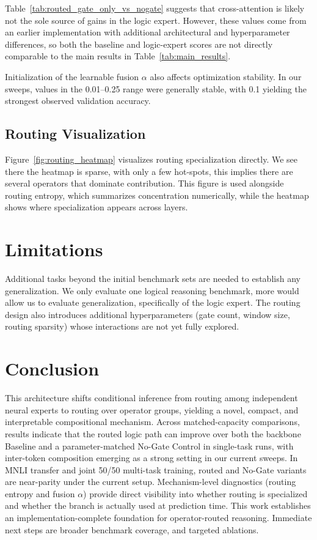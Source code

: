 \documentclass[10pt,twocolumn,letterpaper]{article}
\begin{document}
Table~\ref{tab:routed_gate_only_vs_nogate} suggests that cross-attention is
likely not the sole source of gains in the logic expert. However, these values
come from an earlier implementation with additional architectural and
hyperparameter differences, so both the baseline and logic-expert scores are
not directly comparable to the main results in Table~\ref{tab:main_results}.

Initialization of the learnable fusion $\alpha$ also affects optimization
stability. In our sweeps, values in the 0.01--0.25 range were generally stable,
with 0.1 yielding the strongest observed validation accuracy.

\subsection{Routing Visualization}

Figure~\ref{fig:routing_heatmap} visualizes routing specialization directly.
We see there the heatmap is sparse, with only a few hot-spots, this implies
there are several operators that dominate contribution.
This figure is used alongside routing entropy, which summarizes concentration
numerically, while the heatmap shows where specialization appears across layers.

\section{Limitations}

Additional tasks beyond the initial benchmark sets are
needed to establish any generalization.
We only evaluate one logical reasoning benchmark, more would allow us to
evaluate generalization, specifically of the logic expert.
The routing design also introduces additional hyperparameters
(gate count, window size, routing sparsity) whose
interactions are not yet fully explored.

\section{Conclusion}

This architecture shifts conditional inference from routing among
independent neural experts to routing over operator groups, yielding a
novel, compact, and interpretable compositional mechanism.
Across matched-capacity comparisons, results indicate that the routed logic
path can improve over both the backbone Baseline and a parameter-matched
No-Gate Control in single-task runs, with inter-token composition emerging as
a strong setting in our current sweeps. In MNLI transfer and joint 50/50
multi-task training, routed and No-Gate variants are near-parity under the
current setup.
Mechanism-level diagnostics (routing entropy and fusion
$\alpha$) provide direct visibility into whether routing is specialized and
whether the branch is actually used at prediction time.
This work establishes an implementation-complete foundation for operator-routed
reasoning. Immediate next steps are broader benchmark coverage, and targeted ablations.
\end{document}
